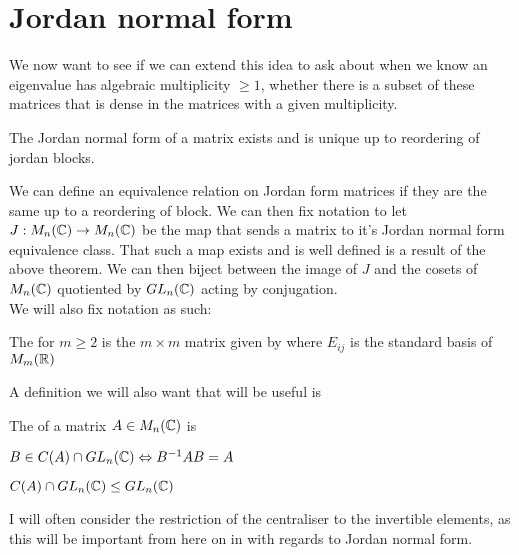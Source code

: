 \documentclass{article}
\begin{document}
\section{Jordan normal form}
We now want to see if we can extend this idea to ask about when we know an eigenvalue has algebraic multiplicity $\geq 1$, whether there is a subset of these matrices that is dense in the matrices with a given multiplicity. 

\begin{theorem}
 The Jordan normal form of a matrix exists and is unique up to reordering of jordan blocks. 
\end{theorem}
We can define an equivalence relation on Jordan form matrices if they are the same up to a reordering of block.
We can then fix notation to let $J:M_n(\mathbb{C}) \to M_n(\mathbb{C})$ be the map that sends a matrix to it's Jordan normal form equivalence class. That such a map exists and is well defined is a result of the above theorem. We can then biject between the image of $J$ and the cosets of $M_n(\mathbb{C})$ quotiented by $GL_n(\mathbb{C})$ acting by conjugation. \\
We will also fix notation as such: 
\begin{definition}
The  for $m \geq 2$ is the $m \times m$ matrix given by  
where $E_{ij}$ is the standard basis of $M_m(\mathbb{R})$
\end{definition}
A definition we will also want that will be useful is 
\begin{definition}
	The  of a matrix $A \in M_n(\mathbb{C})$ is 
\end{definition}

\begin{lemma}
	$B \in C(A)\cap GL_n(\mathbb{C}) \Leftrightarrow B^{-1}AB = A$
\end{lemma}

\begin{lemma}
	$C(A) \cap GL_n(\mathbb{C}) \leq GL_n(\mathbb{C})$
\end{lemma}

I will often consider the restriction of the centraliser to the invertible elements, as this will be important from here on in with regards to Jordan normal form.

\end{document}
